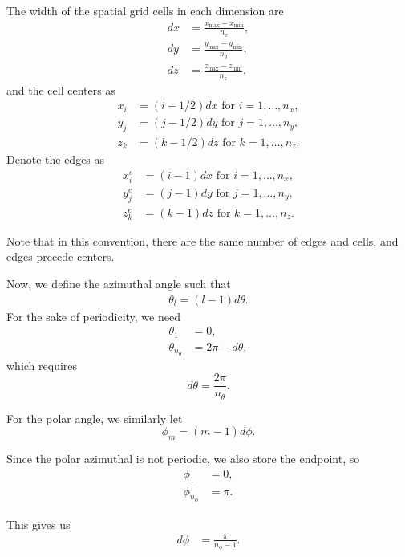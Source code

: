 \documentclass[ms,cpyr,lof,lot]{uathesis}
\begin{document}
The width of the spatial grid cells in each dimension are
\begin{align*}
  dx &= \frac{x_{\max}-x_{\min}}{n_x}, \\
  dy &= \frac{y_{\max}-y_{\min}}{n_y}, \\
  dz &= \frac{z_{\max}-z_{\min}}{n_z}.
\end{align*}
and the cell centers as
\begin{align*}
  x_i &= (i-1/2)dx \mbox{ for } i=1,\ldots,n_x, \\
  y_j &= (j-1/2)dy \mbox{ for } j=1,\ldots,n_y, \\
  z_k &= (k-1/2)dz \mbox{ for } k=1,\ldots,n_z.
\end{align*}
Denote the edges as
\begin{align*}
  x_i^e &= (i-1)dx \mbox{ for } i=1,\ldots,n_x, \\
  y_j^e &= (j-1)dy \mbox{ for } j=1,\ldots,n_y, \\
  z_k^e &= (k-1)dz \mbox{ for } k=1,\ldots,n_z.
\end{align*}

Note that in this convention, there are the same number of edges and cells,
and edges precede centers.

Now, we define the azimuthal angle such that
\begin{align*}
  \theta_l = (l-1)d\theta.
\end{align*}
For the sake of periodicity, we need
\begin{align*}
  \theta_1 &= 0, \\
  \theta_{n_\theta} &= 2\pi-d\theta,
\end{align*}
which requires
\begin{equation*}
  d\theta = \frac{2\pi}{n_\theta}.
\end{equation*}

For the polar angle, we similarly let
\begin{equation*}
  \phi_m = (m-1)d\phi.
\end{equation*}

Since the polar azimuthal is not periodic, we also store the endpoint, so
\begin{align*}
  \phi_1 &= 0, \\
  \phi_{n_\phi} &= \pi.
\end{align*}

This gives us
\begin{align*}
  d\phi &= \frac{\pi}{n_\phi-1}.
\end{align*}
\end{document}
